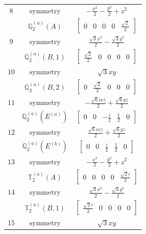 \documentclass[fleqn,8pt,landscape]{jsarticle}
\begin{document}
\begin{longtable}{ccc}
$ 8 $ & $ \text{symmetry} $ & $ - \frac{x^{2}}{2} - \frac{y^{2}}{2} + z^{2} $ \\
$  $ & $ \mathbb{Q}_{2}^{(a)}(A) $ & $ \begin{bmatrix} 0 & 0 & 0 & 0 & \frac{\sqrt{2}}{2} \end{bmatrix} $ \\ \hline
$ 9 $ & $ \text{symmetry} $ & $ \frac{\sqrt{3} x^{2}}{2} - \frac{\sqrt{3} y^{2}}{2} $ \\
$  $ & $ \mathbb{Q}_{2}^{(a)}(B,1) $ & $ \begin{bmatrix} \frac{\sqrt{2}}{2} & 0 & 0 & 0 & 0 \end{bmatrix} $ \\ \hline
$ 10 $ & $ \text{symmetry} $ & $ \sqrt{3} x y $ \\
$  $ & $ \mathbb{Q}_{2}^{(a)}(B,2) $ & $ \begin{bmatrix} 0 & \frac{\sqrt{2}}{2} & 0 & 0 & 0 \end{bmatrix} $ \\ \hline
$ 11 $ & $ \text{symmetry} $ & $ - \frac{\sqrt{6} i x z}{2} + \frac{\sqrt{6} y z}{2} $ \\
$  $ & $ \mathbb{Q}_{2}^{(a)}(E^{(a)}) $ & $ \begin{bmatrix} 0 & 0 & - \frac{i}{2} & \frac{1}{2} & 0 \end{bmatrix} $ \\ \hline
$ 12 $ & $ \text{symmetry} $ & $ \frac{\sqrt{6} i x z}{2} + \frac{\sqrt{6} y z}{2} $ \\
$  $ & $ \mathbb{Q}_{2}^{(a)}(E^{(b)}) $ & $ \begin{bmatrix} 0 & 0 & \frac{i}{2} & \frac{1}{2} & 0 \end{bmatrix} $ \\ \hline
$ 13 $ & $ \text{symmetry} $ & $ - \frac{x^{2}}{2} - \frac{y^{2}}{2} + z^{2} $ \\
$  $ & $ \mathbb{T}_{2}^{(a)}(A) $ & $ \begin{bmatrix} 0 & 0 & 0 & 0 & \frac{\sqrt{2} i}{2} \end{bmatrix} $ \\ \hline
$ 14 $ & $ \text{symmetry} $ & $ \frac{\sqrt{3} x^{2}}{2} - \frac{\sqrt{3} y^{2}}{2} $ \\
$  $ & $ \mathbb{T}_{2}^{(a)}(B,1) $ & $ \begin{bmatrix} \frac{\sqrt{2} i}{2} & 0 & 0 & 0 & 0 \end{bmatrix} $ \\ \hline
$ 15 $ & $ \text{symmetry} $ & $ \sqrt{3} x y $ \\

\end{longtable}
\end{document}
